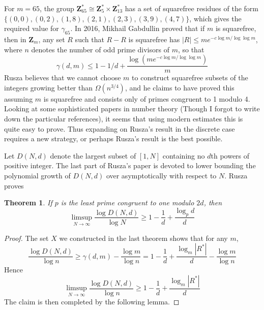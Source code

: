 \documentclass{report}
\theoremstyle{plain}
\theoremstyle{plain}
\newtheorem{theorem}{Theorem}
\begin{document}
For $m = 65$, the group $\mathbf{Z}_{65}^* \cong \mathbf{Z}_{5}^* \times \mathbf{Z}_{13}^*$ has a set of squarefree residues of the form $\{ (0,0), (0,2), (1,8), (2,1), (2,3), (3,9), (4,7) \}$, which gives the required value for $\gamma_{65}$. In 2016, Mikhail Gabdullin proved that if $m$ is squarefree, then in $\mathbf{Z}_m$, any set $R$ such that $R - R$ is squarefree has $|R| \leq me^{-c \log m / \log \log m}$, where $n$ denotes the number of odd prime divisors of $m$, so that
%
\[ \gamma(d,m) \leq 1 - 1/d + \frac{\log(me^{-c \log m / \log \log m})}{m} \]
%
Rusza believes that we cannot choose $m$ to construct squarefree subsets of the integers growing better than $\Omega(n^{3/4})$, and he claims to have proved this assuming $m$ is squarefree and consists only of primes congruent to 1 modulo 4. Looking at some sophisticated papers in number theory (Though I forgot to write down the particular references), it seems that using modern estimates this is quite easy to prove. Thus expanding on Rusza's result in the discrete case requires a new strategy, or perhaps Rusza's result is the best possible.

Let $D(N,d)$ denote the largest subset of $[1,N]$ containing no $d$th powers of positive integer. The last part of Rusza's paper is devoted to lower bounding the polynomial growth of $D(N,d)$ over asymptotically with respect to $N$. Rusza proves

\begin{theorem}
    If $p$ is the least prime congruent to one modulo $2d$, then
    \[ \limsup_{N \to \infty} \frac{\log D(N,d)}{\log N} \geq 1 - \frac{1}{d} + \frac{\log_p d}{d} \]
\end{theorem}
\begin{proof}
    The set $X$ we constructed in the last theorem shows that for any $m$,
    \[ \frac{\log D(N,d)}{\log n} \geq \gamma(d,m) - \frac{\log m}{\log n} = 1 - \frac{1}{d} + \frac{\log_m |R^*|}{d} - \frac{\log m}{\log n} \]
    Hence
    \[ \limsup_{N \to \infty} \frac{\log D(N,d)}{\log n} \geq 1 - \frac{1}{d} + \frac{\log_m |R^*|}{d} \]
    The claim is then completed by the following lemma.
\end{proof}
\end{document}
